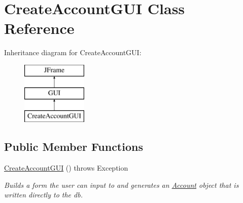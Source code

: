 \hypertarget{class_create_account_g_u_i}{}\section{Create\+Account\+G\+UI Class Reference}
\label{class_create_account_g_u_i}
Inheritance diagram for Create\+Account\+G\+UI\+:\begin{figure}[H]
\begin{center}
\leavevmode
\includegraphics[height=3.000000cm]{class_create_account_g_u_i}
\end{center}
\end{figure}
\subsection*{Public Member Functions}
\begin{DoxyCompactItemize}
\item 
\mbox{\label{class_create_account_g_u_i_aad1fa44b4ad6345b06a03e8f4cc10f17}} 
\hyperlink{class_create_account_g_u_i_aad1fa44b4ad6345b06a03e8f4cc10f17}{Create\+Account\+G\+UI} ()  throws Exception
\begin{DoxyCompactList}\small\item\em Builds a form the user can input to and generates an \hyperlink{class_account}{Account} object that is written directly to the db. \end{DoxyCompactList}\end{DoxyCompactItemize}
